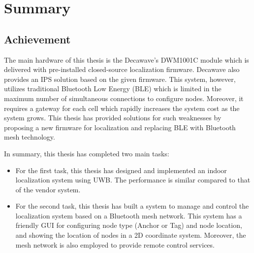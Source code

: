 \documentclass[\main/thesis.tex]{subfiles}
\begin{document}
\graphicspath{{img/}{summary/img/}}

\chapter{Summary}

\section{Achievement}
The main hardware of this thesis is the Decawave's DWM1001C module which is delivered with pre-installed closed-source localization firmware. Decawave also provides an IPS solution based on the given firmware. This system, however, utilizes traditional Bluetooth Low Energy (BLE) which is limited in the maximum number of simultaneous connections to configure nodes. Moreover, it requires a gateway for each cell which rapidly increases the system cost as the system grows. This thesis has provided solutions for such weaknesses by proposing a new firmware for localization and replacing BLE with Bluetooth mesh technology.

In summary, this thesis has completed two main tasks:
\begin{itemize}
    \item For the first task, this thesis has designed and implemented an indoor localization system using UWB. The performance is similar compared to that of the vendor system.
    \item For the second task, this thesis has built a system to manage and control the localization system based on a Bluetooth mesh network. This system has a friendly GUI for configuring node type (Anchor or Tag) and node location, and showing the location of nodes in a 2D coordinate system. Moreover, the mesh network is also employed to provide remote control services.
\end{itemize}
\end{document}
